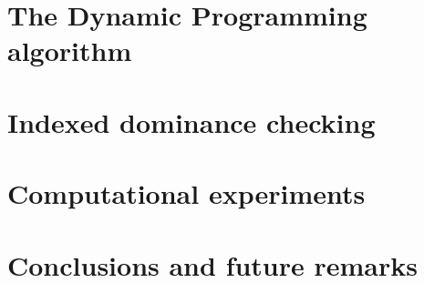 \documentclass{itor}
\newcommand{\dtree}[1]{$#1$-d~tree}
\newcommand{\kdtree}{\dtree{k}}
\begin{document}
\section{The Dynamic Programming algorithm}
\label{sec:dynprog}


\section{Indexed dominance checking}
\label{sec:kdtree}


\section{Computational experiments}
\label{sec:exp}


\section{Conclusions and future remarks}
\label{sec:conc}




\end{document}
